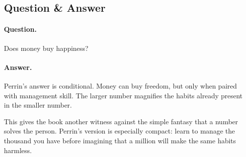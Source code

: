 \documentclass[11pt,oneside]{book}
\begin{document}
\subsection{Question \& Answer}

\paragraph{Question.}
Does money buy happiness?

\paragraph{Answer.}
Perrin's answer is conditional. Money can buy freedom, but only when paired with management skill. The larger number magnifies the habits already present in the smaller number.

This gives the book another witness against the simple fantasy that a number solves the person. Perrin's version is especially compact: learn to manage the thousand you have before imagining that a million will make the same habits harmless.
\end{document}
